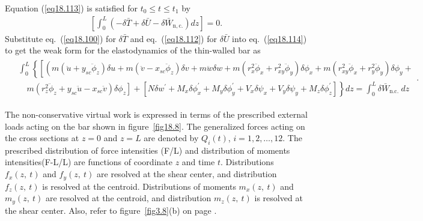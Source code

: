 \documentclass{AeroStructure-ERJohnson}
\begin{document}
Equation (\ref{eq18.113}) is satisfied for $t_{0} \leq t \leq t_{1}$ by
\begin{align}\label{eq18.114}
\left[\int_{0}^{L}\left(-\delta \bar{T}+\delta \bar{U}-\delta \bar{W}_{\mathrm{n}, \mathrm{c}.}\right) d z\right]=0.
\end{align}
Substitute eq.~(\ref{eq18.100}) for $\delta \bar{T}$ and eq.~(\ref{eq18.112}) for $\delta \bar{U}$ into eq.~(\ref{eq18.114}) to get the weak form for the elastodynamics of the thin-walled bar as
\begin{align}\label{eq18.115}
\begin{split}
&\int_{0}^{L}\left\{\left[\left(m\left(\ddot{u}+y_{s c} \ddot{\phi}_{z}\right) \delta u+m\left(\ddot{v}-x_{s c} \ddot{\phi}_{z}\right) \delta v+m \ddot{w} \delta w+m\left(r_{x}^{2} \ddot{\phi}_{x}+r_{x y}^{2} \ddot{\phi}_{y}\right) \delta \phi_{x}+m\left(r_{x y}^{2} \ddot{\phi}_{x}+r_{y}^{2} \ddot{\phi}_{y}\right) \delta \phi_{y}+\right.\right.\right. \\
&\left.\left.\quad m\left(r_{z}^{2} \ddot{\phi}_{z}+y_{s c} \ddot{u}-x_{s c} \ddot{v}\right) \delta \phi_{z}\right]+\left[N \delta w^{\prime}+M_{x} \delta \phi_{x}^{\prime}+M_{y} \delta \phi_{y}^{\prime}+V_{x} \delta \psi_{x}+V_{y} \delta \psi_{y}+M_{z} \delta \phi_{z}^{\prime}\right]\right\} d z=\int_{0}^{L} \delta \bar{W}_{\text {n.c. }} d z\end{split}.
\end{align}

The non-conservative virtual work is expressed in terms of the prescribed external loads acting on the bar shown in figure~\ref{fig18.8}. The generalized forces acting on the cross sections at $z=0$ and $z=L$ are denoted by $Q_{i}(t)$, $i=1,2, \ldots, 12$. The prescribed distribution of force intensities (F/L) and distribution of moments intensities\break (F-L/L) are functions of coordinate $z$ and time $t$. Distributions $f_{x}(z,~t)$ and $f_{y}(z,~t)$ are resolved at the shear center, and distribution $f_{z}(z,~t)$ is resolved at the centroid. Distributions of moments $m_{x}(z,~t)$ and $m_{y}(z,~t)$ are resolved at the centroid, and distribution $m_{z}(z,~t)$ is resolved at the shear center. Also, refer to figure~\ref{fig3.8}(b) on page \pageref{fig3.8}.

{\def\thefigure{18.8}
}
\end{document}
